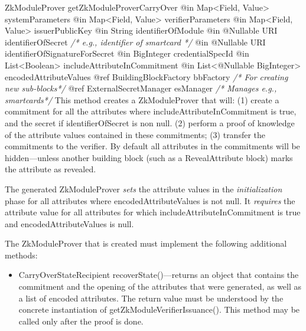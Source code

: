       \begin{method}
      {ZkModuleProver}
      {getZkModuleProverCarryOver}
      {
        {@in Map<Field, Value> systemParameters}
        {@in Map<Field, Value> verifierParameters}
        {@in Map<Field, Value> issuerPublicKey}
        {@in String identifierOfModule}
        {@in @Nullable URI identifierOfSecret \textrm{\emph{/* e.g., identifier of smartcard */}}}
        {@in @Nullable URI identifierOfSignatureForSecret}
        {@in BigInteger credentialSpecId}
        {@in List<Boolean> includeAttributeInCommitment}
        {@in List<@Nullable BigInteger> encodedAttributeValues}
        {@ref BuildingBlockFactory bbFactory \textrm{\emph{/* For creating new sub-blocks*/}}}
        {@ref ExternalSecretManager esManager \textrm{\emph{/* Manages e.g., smartcards*/}}}
      }
      This method creates a ZkModuleProver that will:
      (1) create a commitment for all the attributes where includeAttributeInCommitment is true, and
      the secret if identifierOfSecret is non null.
      (2) perform a proof of knowledge of the attribute values contained in these commitments;
      (3) transfer the commitments to the verifier.
      By default all attributes in the commitments will be hidden---unless another
      building block (such as a RevealAttribute block) marks the
      attribute as revealed.

      The generated ZkModuleProver \emph{sets} the attribute values in the \emph{initialization} phase
      for all attributes where encodedAttributeValues is not null.
      It \emph{requires} the attribute value for all attributes for which
      includeAttributeInCommitment is true and encodedAttributeValues is null.

      The ZkModuleProver that is created must implement the following additional methods:
        \begin{itemize}
          \item CarryOverStateRecipient recoverState()---returns an object that contains the commitment and the opening of the attributes
                that were generated, as well as a list of encoded attributes. The return value must be understood
                by the concrete instantiation of getZkModuleVerifierIssuance().
                This method may be called only after the proof is done.
        \end{itemize}
      \end{method}

